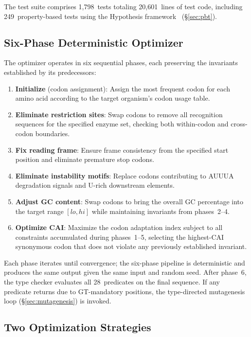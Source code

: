 The test suite comprises 1,798~tests totaling 20,601~lines of test code,
including 249~property-based tests using the Hypothesis
framework~\cite{maciver2019hypothesis} (\S\ref{sec:pbt}).

\subsection{Six-Phase Deterministic Optimizer}\label{sec:optimizer}

The optimizer operates in six sequential phases, each preserving the
invariants established by its predecessors:

\begin{enumerate}[leftmargin=*,itemsep=1pt,topsep=2pt]
\item \textbf{Initialize} (codon assignment): Assign the most frequent
      codon for each amino acid according to the target organism's codon
      usage table.
\item \textbf{Eliminate restriction sites}: Swap codons to remove all
      recognition sequences for the specified enzyme set, checking both
      within-codon and cross-codon boundaries.
\item \textbf{Fix reading frame}: Ensure frame consistency from the
      specified start position and eliminate premature stop codons.
\item \textbf{Eliminate instability motifs}: Replace codons contributing
      to AUUUA degradation signals and U-rich downstream elements.
\item \textbf{Adjust GC content}: Swap codons to bring the overall GC
      percentage into the target range $[lo, hi]$ while maintaining
      invariants from phases~2--4.
\item \textbf{Optimize CAI}: Maximize the codon adaptation index subject
      to all constraints accumulated during phases~1--5, selecting the
      highest-CAI synonymous codon that does not violate any previously
      established invariant.
\end{enumerate}

Each phase iterates until convergence; the six-phase pipeline is
deterministic and produces the same output given the same input and
random seed.  After phase~6, the type checker evaluates all 28~predicates
on the final sequence.  If any predicate returns \FAIL{} due to
GT-mandatory positions, the type-directed mutagenesis loop
(\S\ref{sec:mutagenesis}) is invoked.

\subsection{Two Optimization Strategies}\label{sec:strategies}

